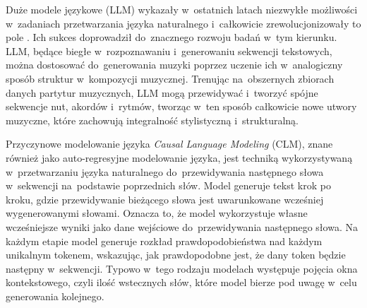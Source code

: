 \documentclass[data-science]{agh-wi} %
\begin{document}
Duże modele językowe (LLM) wykazały w~ostatnich latach niezwykłe możliwości w~zadaniach przetwarzania języka naturalnego i~całkowicie zrewolucjonizowały to pole \cite{adiwardana2020humanlike, end_of_nlp}. Ich sukces doprowadził do~znacznego rozwoju badań w~tym kierunku. LLM, będące biegłe w~rozpoznawaniu i~generowaniu sekwencji tekstowych, można dostosować do~generowania muzyki poprzez uczenie ich w~analogiczny sposób struktur w~kompozycji muzycznej. Trenując na~obszernych zbiorach danych partytur muzycznych, LLM mogą przewidywać i~tworzyć spójne sekwencje nut, akordów i~rytmów, tworząc w~ten sposób całkowicie nowe utwory muzyczne, które zachowują integralność stylistyczną i~strukturalną.

Przyczynowe modelowanie języka \textit{Causal Language Modeling} (CLM), znane również jako auto-regresyjne modelowanie języka, jest techniką wykorzystywaną w~przetwarzaniu języka naturalnego do~przewidywania następnego słowa w~sekwencji na~podstawie poprzednich słów. Model generuje tekst krok po kroku, gdzie przewidywanie bieżącego słowa jest uwarunkowane wcześniej wygenerowanymi słowami. Oznacza to, że model wykorzystuje własne wcześniejsze wyniki jako dane wejściowe do~przewidywania następnego słowa. Na każdym etapie model generuje rozkład prawdopodobieństwa nad każdym unikalnym tokenem, wskazując, jak prawdopodobne jest, że dany token będzie następny w~sekwencji. Typowo w~tego rodzaju modelach występuje pojęcia okna kontekstowego, czyli ilość wstecznych słów, które model bierze pod uwagę w~celu generowania kolejnego.
\end{document}
